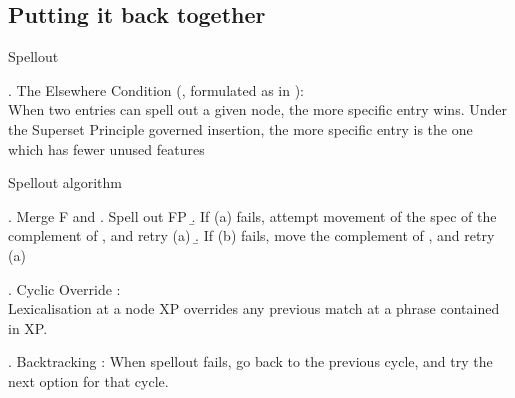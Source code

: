 \documentclass{article}
\begin{document}
%
%
%
%
%
%




\subsection{Putting it back together}



Spellout

\ex. The Elsewhere Condition (\citealt{kiparsky1973}, formulated as in \citealt{caha2020}):\\
When two entries can spell out a given node, the more specific entry wins. Under the Superset Principle governed insertion, the more specific entry is the one which has fewer unused features

Spellout algorithm \citep{starke2018}

\ex. Merge F and
 \a. Spell out FP
 \b. If (a) fails, attempt movement of the spec of the complement of , and retry (a)
 \b. If (b) fails, move the complement of , and retry (a)

\ex. Cyclic Override \citep{starke2018}:\\
Lexicalisation at a node XP overrides any previous match at a phrase contained in XP.

\ex. Backtracking \citep{starke2018}:
When spellout fails, go back to the previous cycle, and try the next option for that cycle.
\end{document}
